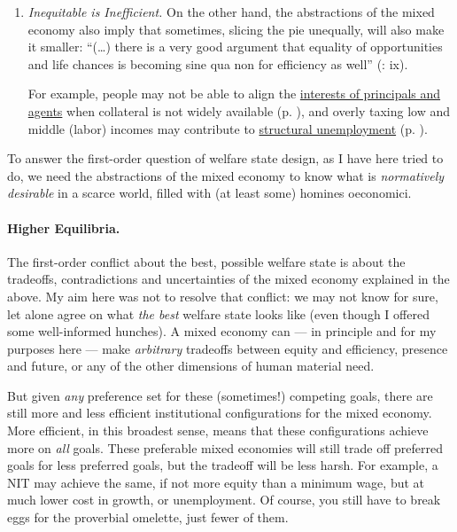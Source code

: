 \begin{enumerate}
\begin{enumerate}
		\item \emph{Inequitable is Inefficient.} On the other hand, the abstractions of the mixed economy also imply that sometimes, slicing the pie unequally, will also make it smaller: ``(\ldots) there is a very good argument that equality of opportunities and life chances is becoming sine qua non for efficiency as well'' (\citealt{Esping-Andersen2002}: ix).
		
		For example, people may not be able to align the \hyperref[sec:principal-agent_problem]{interests of principals and agents} when collateral is not widely available (p. \pageref{sec:principal-agent_problem}), and overly taxing low and middle (labor) incomes may contribute to \hyperref[sec:minimal_DWL]{structural unemployment} (p. \pageref{sec:minimal_DWL}).
	\end{enumerate}
	
	To answer the first-order question of welfare state design, as I have here tried to do, we need the abstractions of the mixed economy to know what is \emph{normatively desirable} in a scarce world, filled with (at least some) homines oeconomici.	
\end{enumerate}

\paragraph[Higher Equilibria]{Higher Equilibria.} The first-order conflict about the best, possible welfare state is about the tradeoffs, contradictions and uncertainties of the mixed economy explained in the above. My aim here was not to resolve that conflict: we may not know for sure, let alone agree on what \emph{the best} welfare state looks like (even though I offered some well-informed hunches). A mixed economy can --- in principle and for my purposes here --- make \emph{arbitrary} tradeoffs between equity and efficiency, presence and future, or any of the other dimensions of human material need. 

But given \emph{any} preference set for these (sometimes!) competing goals, there are still more and less efficient institutional configurations for the mixed economy. More efficient, in this broadest sense, means that these configurations achieve more on \emph{all} goals. These preferable mixed economies will still trade off preferred goals for less preferred goals, but the tradeoff will be less harsh. For example, a \gls{NIT} may achieve the same, if not more equity than a minimum wage, but at much lower cost in growth, or unemployment. Of course, you still have to break eggs for the proverbial omelette, just fewer of them.

